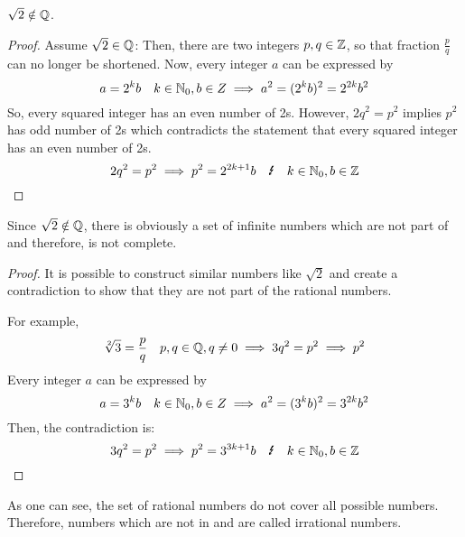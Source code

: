 \begin{lemma}
    $\sqrt{2} \notin \mathbb{Q}$.
\end{lemma}
\begin{proof}
    Assume $\sqrt{2} \in \mathbb{Q}$:
    Then, there are two integers $p,q \in \mathbb{Z}$, so that fraction $\frac{p}{q}$ 
    can no longer be shortened.
    Now, every integer $a$ can be expressed by 
    \begin{equation}
        a = 2^k b \quad k \in \mathbb{N}_0, b \in Z \implies a^2 = (2^k b)^2 = 2^{2k} b^2
    \end{equation}
    So, every squared integer has an even number of 2s.
    However, $2 q^2 = p^2$ implies $p^2$ has odd number of 2s which contradicts the statement 
    that every squared integer has an even number of 2s.
    \begin{equation}
        2 q^2 = p^2 \implies p^2 = 2^{2k+1} b \quad \blitz  \quad k \in \Nzero, b \in \Z
    \end{equation}
\end{proof}
\begin{corollary}
    Since $\sqrt{2} \notin \mathbb{Q}$, there is obviously a set of infinite numbers which are not part of 
    \Q{} and therefore, \Q{} is not complete.
\end{corollary}
\begin{proof}
    It is possible to construct similar numbers like $\sqrt{2}$ and create a contradiction to show
    that they are not part of the rational numbers.

    For example,
    \begin{equation}
        \sqrt[2]{3} = \frac{p}{q} \quad p,q \in \mathbb{Q}, q \ne 0 \implies 3 q^2 = p^2 \implies p^2 
    \end{equation}
    Every integer $a$ can be expressed by 
    \begin{equation}
        a = 3^k b \quad k \in \mathbb{N}_0, b \in Z \implies a^2 = (3^k b)^2 = 3^{2k} b^2
    \end{equation}
    Then, the contradiction is:
    \begin{equation}
        3 q^2 = p^2 \implies p^2 = 3^{3k+1} b \quad \blitz  \quad k \in \Nzero, b \in \Z
    \end{equation}
\end{proof}

\begin{definition}
    As one can see, the set of rational numbers do not cover all possible numbers.
    Therefore, numbers which are not in \Q{} and are called irrational numbers.
\end{definition}

